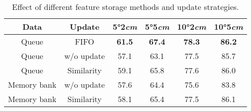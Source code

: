 \begin{table}[htbp]
    \small
    \centering
    \begin{subtable}[t]{1.0\linewidth}  %
        \centering
        \setlength\tabcolsep{3pt}%
        \begin{tabular}{cc|cccc}
            \toprule
            Data & Update & 5°2\emph{cm} & 5°5\emph{cm} & 10°2\emph{cm}  & 10°5\emph{cm}\\
            \midrule
            \rowcolor{mygray}
            Queue  & FIFO  & \textbf{61.5}          &\textbf{67.4}    &\textbf{78.3} &\textbf{86.2}    \\
            Queue & w/o update  & 57.1          &63.1    &77.5 &85.7   \\
            Queue & Similarity  & 59.1         &65.8    &77.6 &86.0   \\
            Memory bank & w/o update  & 57.6          &64.4    &75.6 &83.8   \\
            Memory bank & Similarity  &  58.1         &65.4    &77.5 &86.1   \\
            \bottomrule
        \end{tabular}
        \caption{Effect of different feature storage methods and update strategies.}
        \label{tab:ab_causal_data_update}
    \end{subtable}
    
     


\end{table}
